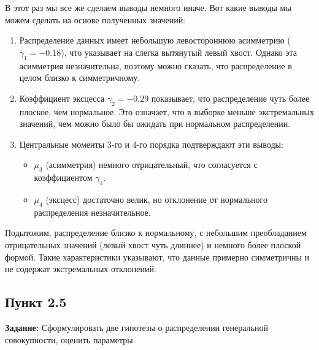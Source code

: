\documentclass[12pt]{article}
\begin{document}
В этот раз мы все же сделаем выводы немного иначе. Вот какие выводы мы можем сделать на основе полученных значений:
\begin{enumerate}
    \item Распределение данных имеет небольшую левостороннюю асимметрию ($\gamma_1 = -0.18$), что указывает на слегка вытянутый левый хвост. Однако эта асимметрия незначительна, поэтому можно сказать, что распределение в целом близко к симметричному.

    \item Коэффициент эксцесса $\gamma_2 = -0.29$ показывает, что распределение чуть более плоское, чем нормальное. Это означает, что в выборке меньше экстремальных значений, чем можно было бы ожидать при нормальном распределении.

    \item Центральные моменты 3-го и 4-го порядка подтверждают эти выводы:
        \begin{itemize}
            \item $\mu_3$ (асимметрия) немного отрицательный, что согласуется с коэффициентом $\gamma_1$.
            \item $\mu_4$ (эксцесс) достаточно велик, но отклонение от нормального распределения незначительное.
        \end{itemize}
    
\end{enumerate}

Подытожим, распределение близко к нормальному, с небольшим преобладанием отрицательных значений (левый хвост чуть длиннее) и немного более плоской формой. Такие характеристики указывают, что данные примерно симметричны и не содержат экстремальных отклонений.

\subsection*{Пункт 2.5}
\textbf{Задание:} Сформулировать две гипотезы о распределении генеральной совокупности, оценить параметры.
\end{document}
